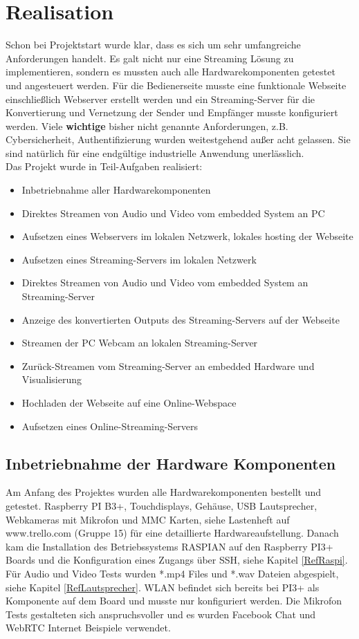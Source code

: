 \section{Realisation}
Schon bei Projektstart wurde klar, dass es sich um sehr umfangreiche Anforderungen handelt. Es galt nicht nur eine Streaming Lösung zu implementieren, sondern es mussten auch alle Hardwarekomponenten getestet und angesteuert werden. Für die Bedienerseite musste eine funktionale Webseite einschließlich Webserver erstellt werden und ein Streaming-Server für die Konvertierung und Vernetzung der Sender und Empfänger musste konfiguriert werden. Viele \textbf{wichtige} bisher nicht genannte Anforderungen, z.B. Cybersicherheit, Authentifizierung wurden weitestgehend außer acht gelassen. Sie sind natürlich für eine endgültige industrielle Anwendung unerlässlich.\\

Das Projekt wurde in Teil-Aufgaben realisiert:
\begin{itemize}
\item Inbetriebnahme aller Hardwarekomponenten

\item Direktes Streamen von Audio und Video vom embedded System an PC
\item Aufsetzen eines Webservers im lokalen Netzwerk, lokales hosting der Webseite
\item Aufsetzen eines Streaming-Servers im lokalen Netzwerk
\item Direktes Streamen von Audio und Video vom embedded System an Streaming-Server
\item Anzeige des konvertierten Outputs des Streaming-Servers auf der Webseite

\item Streamen der PC Webcam an lokalen Streaming-Server
\item Zurück-Streamen vom Streaming-Server an embedded Hardware und Visualisierung

\item Hochladen der Webseite auf eine Online-Webspace
\item Aufsetzen eines Online-Streaming-Servers
\end{itemize}

\subsection{Inbetriebnahme der Hardware Komponenten}
Am Anfang des Projektes wurden alle Hardwarekomponenten bestellt und getestet. Raspberry PI B3+, Touchdisplays, Gehäuse, USB Lautsprecher, Webkameras mit Mikrofon und MMC Karten, siehe Lastenheft auf www.trello.com (Gruppe 15) für eine detaillierte Hardwareaufstellung. Danach kam die Installation des Betriebssystems RASPIAN auf den Raspberry PI3+ Boards und die Konfiguration eines Zugangs über SSH, siehe Kapitel \ref{RefRaspi}. Für Audio und Video Tests wurden *.mp4 Files und *.wav Dateien abgespielt, siehe Kapitel \ref{RefLautsprecher}. WLAN befindet sich bereits bei PI3+ als Komponente auf dem Board und musste nur konfiguriert werden. Die Mikrofon Tests gestalteten sich anspruchsvoller und es wurden Facebook Chat und WebRTC Internet Beispiele verwendet.

